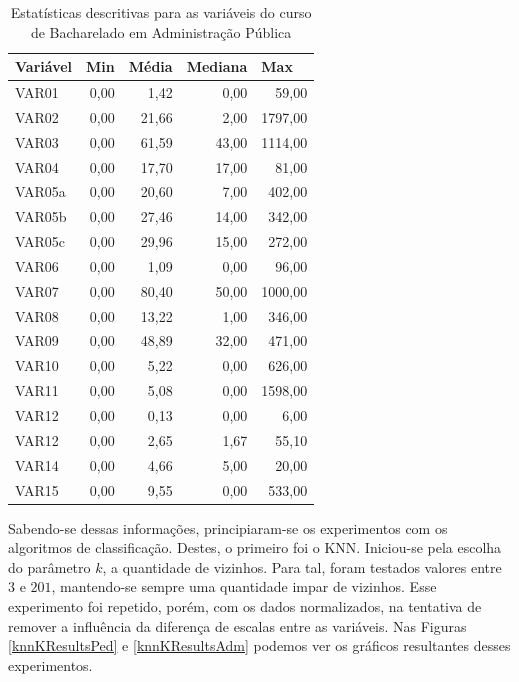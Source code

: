 \begin{table}[!htb]
  \centering
  \caption{Estatísticas descritivas para as variáveis do curso de Bacharelado em Administração Pública}
  \label{decribingStatisticsAdm}
  \begin{tabular}{@{}lrrrr@{}}
    \toprule
    \textbf{Variável} & \multicolumn{1}{l}{\textbf{Min}} & \multicolumn{1}{l}{\textbf{Média}} & \multicolumn{1}{l}{\textbf{Mediana}} & \multicolumn{1}{l}{\textbf{Max}} \\ \midrule
    VAR01 & 0,00 & 1,42 & 0,00 & 59,00 \\
    VAR02 & 0,00 & 21,66 & 2,00 & 1797,00 \\
    VAR03 & 0,00 & 61,59 & 43,00 & 1114,00 \\
    VAR04 & 0,00 & 17,70 & 17,00 & 81,00 \\
    VAR05a & 0,00 & 20,60 & 7,00 & 402,00 \\
    VAR05b & 0,00 & 27,46 & 14,00 & 342,00 \\
    VAR05c & 0,00 & 29,96 & 15,00 & 272,00 \\
    VAR06 & 0,00 & 1,09 & 0,00 & 96,00 \\
    VAR07 & 0,00 & 80,40 & 50,00 & 1000,00 \\
    VAR08 & 0,00 & 13,22 & 1,00 & 346,00 \\
    VAR09 & 0,00 & 48,89 & 32,00 & 471,00 \\
    VAR10 & 0,00 & 5,22 & 0,00 & 626,00 \\
    VAR11 & 0,00 & 5,08 & 0,00 & 1598,00 \\
    VAR12 & 0,00 & 0,13 & 0,00 & 6,00 \\
    VAR12 & 0,00 & 2,65 & 1,67 & 55,10 \\
    VAR14 & 0,00 & 4,66 & 5,00 & 20,00 \\
    VAR15 & 0,00 & 9,55 & 0,00 & 533,00 \\ \bottomrule
  \end{tabular}
\end{table}

Sabendo-se dessas informações, principiaram-se os experimentos com os algoritmos
de classificação. Destes, o primeiro foi o KNN. Iniciou-se pela escolha do
parâmetro \(k\), a quantidade de vizinhos. Para tal, foram testados valores
entre \(3\) e \(201\), mantendo-se sempre uma quantidade impar de vizinhos. Esse
experimento foi repetido, porém, com os dados normalizados, na tentativa de
remover a influência da diferença de escalas entre as variáveis. Nas Figuras
\ref{knnKResultsPed} e \ref{knnKResultsAdm} podemos ver os gráficos resultantes
desses experimentos.

